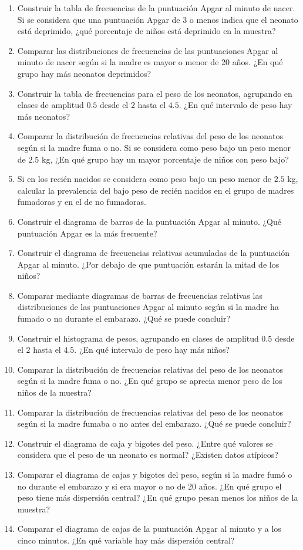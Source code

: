 \documentclass[
  a4paper,
]{scrreport}
\theoremstyle{definition}
\theoremstyle{remark}
\begin{document}
\begin{enumerate}
\def\labelenumi{\alph{enumi}.}
\item
  Construir la tabla de frecuencias de la puntuación Apgar al minuto de
  nacer. Si se considera que una puntuación Apgar de 3 o menos indica
  que el neonato está deprimido, ¿qué porcentaje de niños está deprimido
  en la muestra?
\item
  Comparar las distribuciones de frecuencias de las puntuaciones Apgar
  al minuto de nacer según si la madre es mayor o menor de 20 años. ¿En
  qué grupo hay más neonatos deprimidos?
\item
  Construir la tabla de frecuencias para el peso de los neonatos,
  agrupando en clases de amplitud \(0.5\) desde el \(2\) hasta el
  \(4.5\). ¿En qué intervalo de peso hay más neonatos?
\item
  Comparar la distribución de frecuencias relativas del peso de los
  neonatos según si la madre fuma o no. Si se considera como peso bajo
  un peso menor de \(2.5\) kg, ¿En qué grupo hay un mayor porcentaje de
  niños con peso bajo?
\item
  Si en los recién nacidos se considera como peso bajo un peso menor de
  \(2.5\) kg, calcular la prevalencia del bajo peso de recién nacidos en
  el grupo de madres fumadoras y en el de no fumadoras.
\item
  Construir el diagrama de barras de la puntuación Apgar al minuto. ¿Qué
  puntuación Apgar es la más frecuente?
\item
  Construir el diagrama de frecuencias relativas acumuladas de la
  puntuación Apgar al minuto. ¿Por debajo de que puntuación estarán la
  mitad de los niños?
\item
  Comparar mediante diagramas de barras de frecuencias relativas las
  distribuciones de las puntuaciones Apgar al minuto según si la madre
  ha fumado o no durante el embarazo. ¿Qué se puede concluir?
\item
  Construir el histograma de pesos, agrupando en clases de amplitud
  \(0.5\) desde el \(2\) hasta el \(4.5\). ¿En qué intervalo de peso hay
  más niños?
\item
  Comparar la distribución de frecuencias relativas del peso de los
  neonatos según si la madre fuma o no. ¿En qué grupo se aprecia menor
  peso de los niños de la muestra?
\item
  Comparar la distribución de frecuencias relativas del peso de los
  neonatos según si la madre fumaba o no antes del embarazo. ¿Qué se
  puede concluir?
\item
  Construir el diagrama de caja y bigotes del peso. ¿Entre qué valores
  se considera que el peso de un neonato es normal? ¿Existen datos
  atípicos?
\item
  Comparar el diagrama de cajas y bigotes del peso, según si la madre
  fumó o no durante el embarazo y si era mayor o no de 20 años. ¿En qué
  grupo el peso tiene más dispersión central? ¿En qué grupo pesan menos
  los niños de la muestra?
\item
  Comparar el diagrama de cajas de la puntuación Apgar al minuto y a los
  cinco minutos. ¿En qué variable hay más dispersión central?
\end{enumerate}
\end{document}
